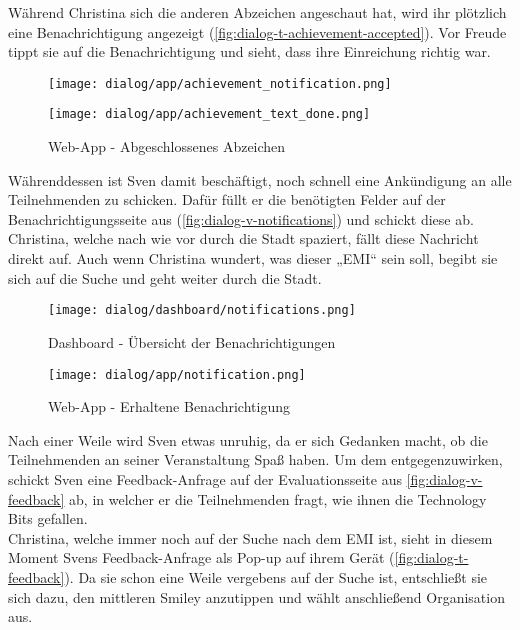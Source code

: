 Während Christina sich die anderen Abzeichen angeschaut hat, wird ihr plötzlich
eine Benachrichtigung angezeigt (\autoref{fig:dialog-t-achievement-accepted}). Vor Freude tippt sie auf die
Benachrichtigung und sieht, dass ihre Einreichung richtig war.

\begin{figure}[htpb]
    \centering
    \begin{minipage}{.5\textwidth}
        \centering
        \texttt{[image: dialog/app/achievement\_notification.png]}
    \end{minipage}%
    \begin{minipage}{.5\textwidth}
        \centering
        \texttt{[image: dialog/app/achievement\_text\_done.png]}
    \end{minipage}
    \caption{Web-App - Abgeschlossenes Abzeichen}
    \label{fig:dialog-t-achievement-accepted}
\end{figure}

Währenddessen ist Sven damit beschäftigt, noch schnell eine Ankündigung an alle
Teilnehmenden zu schicken. Dafür füllt er die benötigten Felder auf der
Benachrichtigungsseite aus (\autoref{fig:dialog-v-notifications}) und schickt
diese ab.
\\
Christina, welche nach wie vor durch die Stadt spaziert, fällt diese Nachricht
direkt auf. Auch wenn Christina wundert, was dieser „EMI“ sein soll, begibt sie
sich auf die Suche und geht weiter durch die Stadt.

\begin{figure}[htpb]
    \centering
    \texttt{[image: dialog/dashboard/notifications.png]}
    \caption{Dashboard - Übersicht der Benachrichtigungen}
    \label{fig:dialog-v-notifications}
\end{figure}

\begin{figure}[htpb]
    \centering
    \texttt{[image: dialog/app/notification.png]}
    \caption{Web-App - Erhaltene Benachrichtigung}
    \label{fig:dialog-t-notification}
\end{figure}

Nach einer Weile wird Sven etwas unruhig, da er sich Gedanken macht, ob die
Teilnehmenden an seiner Veranstaltung Spaß haben. Um dem entgegenzuwirken,
schickt Sven eine Feedback-Anfrage auf der Evaluationsseite aus
\autoref{fig:dialog-v-feedback} ab, in welcher er die Teilnehmenden fragt, wie
ihnen die Technology Bits gefallen.
\\
Christina, welche immer noch auf der Suche nach dem EMI ist, sieht in diesem
Moment Svens Feedback-Anfrage als Pop-up auf ihrem Gerät (\autoref{fig:dialog-t-feedback}). Da sie schon eine Weile vergebens auf der
Suche ist, entschließt sie sich dazu, den mittleren Smiley anzutippen und wählt
anschließend Organisation aus.

